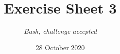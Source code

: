 




\title{{\vspace{-12mm}\huge\textbf{Exercise Sheet 3}}}
\author{\textit{Bash, challenge accepted}}
\date{{\small 28 October 2020}}


    \maketitle
    \bigskip
    
    \bigskip
    
    \bigskip
    
    \bigskip
    
    \bigskip
    
    \bigskip
    
